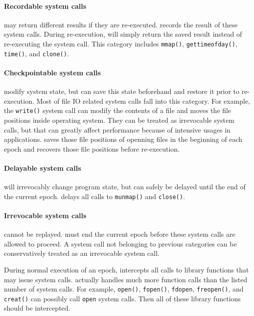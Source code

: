 \paragraph{Recordable system calls} may return different results if they are re-executed. 
\doubletake{} records the result of these system calls. 
During re-execution, \doubletake{} will simply return the saved result 
instead of re-executing the system call. 
This category includes \texttt{mmap()}, \texttt{gettimeofday()}, \texttt{time()}, and \texttt{clone()}.

\paragraph{Checkpointable system calls} modify system state, 
but \doubletake{} can save this state beforehand and restore it prior to re-execution. 
Most of file IO related system calls fall into this category. 
For example, the \texttt{write()} system call can modify the contents of a file and moves the 
file positions inside operating system.
They can be treated as irrevocable system calls, but that can greatly affect performance 
because of intensive usages in applications.
\doubletake{} saves those file positions of openning files in the beginning of each epoch and 
recovers those file positions before re-execution. 
	
\paragraph{Delayable system calls} will irrevocably change program state, but can safely 
be delayed until the end of the current epoch. 
\doubletake{} delays all calls to \texttt{munmap()} and \texttt{close()}.
	
\paragraph{Irrevocable system calls} cannot be replayed. \doubletake{} must end the current epoch 
before these system calls are allowed to proceed. A system call not belonging to previous categories
can be conservatively treated as an irrevocable system call.

\vspace*{\baselineskip} 
During normal execution of an epoch, \doubletake{} intercepts all calls to \pthreads{} 
library functions that may issue system calls. \doubletake{} actually handles much more function calls
than the listed number of system calls. For example, \texttt{open()}, \texttt{fopen()}, \texttt{fdopen}, \texttt{freopen()}, and \texttt{creat()} can possibly call \texttt{open} system calls. 
Then all of these library functions should be intercepted. 

